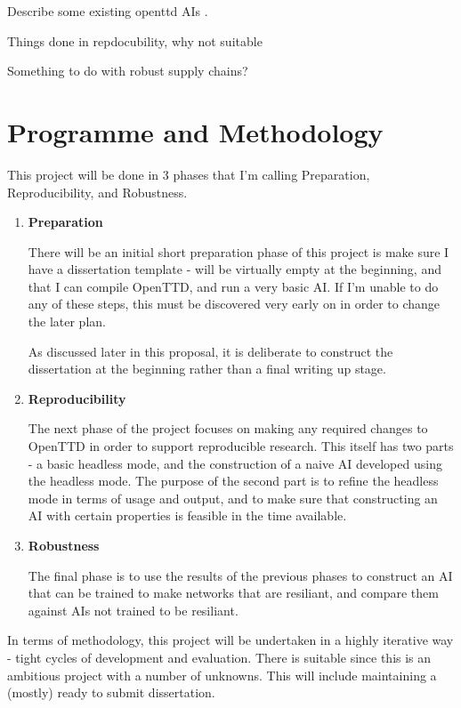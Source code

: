 \documentclass[a4paper,11pt]{article}
\begin{document}
Describe some existing openttd AIs \cite{openttd}.

Things done in repdocubility, why not suitable

Something to do with robust supply chains?

\section{Programme and Methodology}

This project will be done in 3 phases that I'm calling Preparation, Reproducibility, and Robustness.

\begin{enumerate}
\addtocounter{enumi}{-1}
    \item \textbf{Preparation}

    There will be an initial short preparation phase of this project is make sure I have a dissertation template - will be virtually empty at the beginning, and that I can compile OpenTTD, and run a very basic AI. If I'm unable to do any of these steps, this must be discovered very early on in order to change the later plan.

    As discussed later in this proposal, it is deliberate to construct the dissertation at the beginning rather than a final writing up stage.
    
    \item \textbf{Reproducibility}

    The next phase of the project focuses on making any required changes to OpenTTD in order to support reproducible research. This itself has two parts - a basic headless mode, and the construction of a naive AI developed using the headless mode. The purpose of the second part is to refine the headless mode in terms of usage and output, and to make sure that constructing an AI with certain properties is feasible in the time available.
    
    \item \textbf{Robustness}

    The final phase is to use the results of the previous phases to construct an AI that can be trained to make networks that are resiliant, and compare them against AIs not trained to be resiliant.
    
\end{enumerate}

In terms of methodology, this project will be undertaken in a highly iterative way - tight cycles of development and evaluation. There is suitable since this is an ambitious project with a number of unknowns. This will include maintaining a (mostly) ready to submit dissertation.
\end{document}
